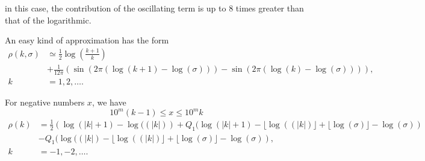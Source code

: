 \documentclass[titlepage,fleqn]{article}%
\begin{document}
\bigskip

\noindent in this case, the contribution of the oscillating term is up to $8$
times greater than that of the logarithmic.%

%


\bigskip

An easy kind of approximation has the form%
\begin{align*}
\rho(k,\sigma)  &  \simeq\frac{1}{2}\log\left(  \frac{k+1}{k}\right) \\
&  +\frac{1}{12\pi}\left(  \sin\left(  2\pi(\log(k+1)-\log(\sigma))\right)
-\sin\left(  2\pi(\log(k)-\log(\sigma))\right)  \right)  ,\\
k  &  =1,2,\ldots.
\end{align*}


For negative numbers $x$, we have%
\[
10^{m}(k-1)\leq x\leq10^{m}k
\]%
\begin{align}
\rho(k)  &  =\frac{1}{2}\left(  \log(\left\vert k\right\vert +1)-\log
((\left\vert k\right\vert )\right)  +Q_{1}(\log(\left\vert k\right\vert
+1)-\lfloor\log((\left\vert k\right\vert )\rfloor+\lfloor\log(\sigma
)\rfloor-\log(\sigma))\\
&  -Q_{1}(\log((\left\vert k\right\vert )-\lfloor\log((\left\vert k\right\vert
)\rfloor+\lfloor\log(\sigma)\rfloor-\log(\sigma)),\nonumber\\
k  &  =-1,-2,\ldots.\nonumber
\end{align}
\end{document}

